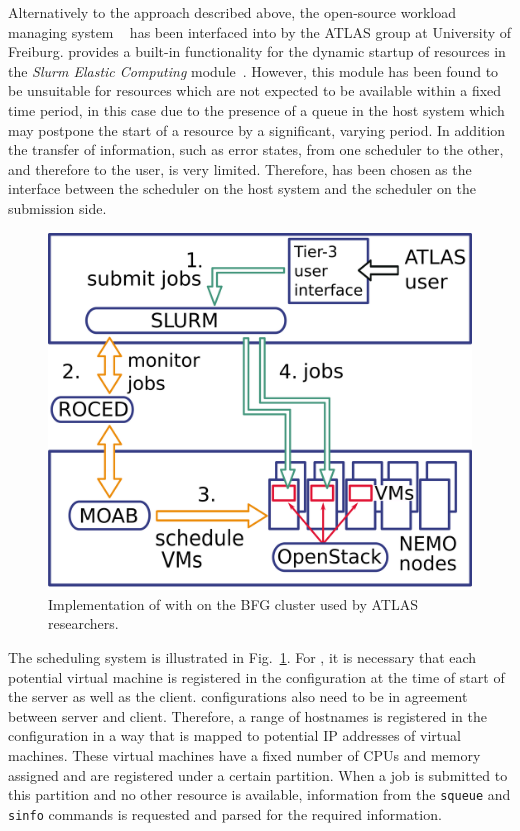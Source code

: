 Alternatively to the approach described above, the
open-source workload managing system \Slurm~\cite{Slurm} has been interfaced into \Roced by
the ATLAS group at University of Freiburg.
\Slurm provides a built-in functionality for the dynamic
startup of resources in the \textit{Slurm Elastic Computing}
module~\cite{SlurmElastic}.
However, this module has been found to be unsuitable for resources which are not
expected to be available within a fixed time period, in this case due to
the presence of a queue in the host system which may postpone the start
of a resource by a significant, varying period.
In addition the transfer of information, such as error states, from one scheduler to the
other, and therefore to the user, is very limited.
Therefore, \Roced has been chosen as the interface between the
\Moab scheduler on the host system and the \Slurm
scheduler on the submission side.


\begin{figure}

\includegraphics[width=0.95\linewidth]{figures/virtualisierung_ROCED.png}
\caption{Implementation of \Roced with \Slurm on the BFG cluster used by ATLAS researchers.}
\label{fig:slurmRocedBFG}
\end{figure}

The scheduling system is illustrated in Fig.~\ref{fig:slurmRocedBFG}.
For \Slurm, it is necessary that each potential virtual
machine is registered in the configuration at the time of start of the
\Slurm server as well as the client. \Slurm configurations also
need to be in agreement between server and client.
Therefore, a range of hostnames is registered in the configuration in
a way that is mapped to potential IP addresses of virtual machines.
These virtual machines have a fixed number of CPUs and memory assigned and are
registered under a certain \Slurm partition.
When a job is submitted to this partition and no other resource is
available, information from the \Slurm \texttt{squeue} and
\texttt{sinfo} commands is requested and parsed for the required information.

